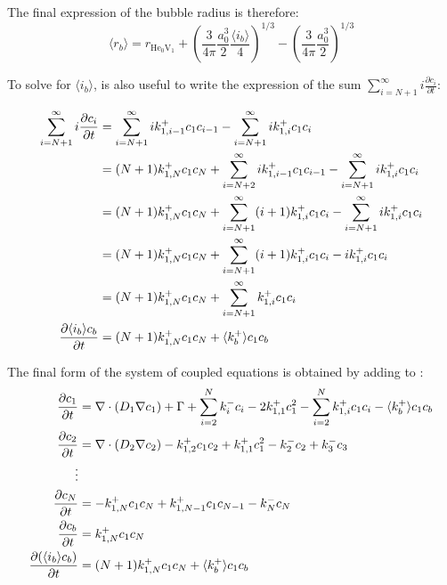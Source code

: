 The final expression of the bubble radius is therefore:
\begin{equation}
    \langle r_b \rangle = r_{\mathrm{He}_0 \mathrm{V}_1} + \left(\frac{3}{4 \pi} \frac{a_0^3}{2} \frac{\langle i_b \rangle}{4} \right)^{1/3} - \left(\frac{3}{4 \pi} \frac{a_0^3}{2} \right)^{1/3}
\end{equation}

To solve for $\langle i_b \rangle$, is also useful to write the expression of the sum $\sum\limits_{i=N+1}^\infty i \frac{\partial c_i}{\partial t}$:

\begin{align}
    \sum\limits_{i=N+1}^\infty i \frac{\partial c_i}{\partial t} &= \sum\limits_{i=N+1}^\infty i k_{1,i-1}^+ c_1 c_{i-1} - \sum\limits_{i=N+1}^\infty i k_{1,i}^+ c_1 c_{i} \nonumber\\
    &= (N+1) k_{1,N}^+ c_1 c_N + \sum\limits_{i=N+2}^\infty i k_{1,i-1}^+ c_1 c_{i-1} - \sum\limits_{i=N+1}^\infty i k_{1,i}^+ c_1 c_{i} \nonumber\\
    &= (N+1) k_{1,N}^+ c_1 c_N + \sum\limits_{i=N+1}^\infty (i + 1) k_{1,i}^+ c_1 c_{i} - \sum\limits_{i=N+1}^\infty i k_{1,i}^+ c_1 c_{i} \nonumber\\
    &= (N+1) k_{1,N}^+ c_1 c_N + \sum\limits_{i=N+1}^\infty (i + 1) k_{1,i}^+ c_1 c_{i} - i k_{1,i}^+ c_1 c_{i} \nonumber\\
    &= (N+1) k_{1,N}^+ c_1 c_N + \sum\limits_{i=N+1}^\infty k_{1,i}^+ c_1 c_{i} \nonumber\\
    \frac{\partial \langle i_b \rangle c_b}{\partial t} &= (N+1) k_{1,N}^+ c_1 c_N + \langle k_b^+ \rangle c_1 c_b
    \labeq{pde for d (cb ib)/ dt}
\end{align}

The final form of the system of coupled equations is obtained by adding  to :
\begin{subequations}
    \begin{align}
        \frac{\partial c_1}{\partial t} &= \nabla \cdot (D_1 \nabla c_1) + \Gamma + \sum\limits_{i=2}^N k_{i}^- c_i- 2k_{1, 1}^+ c_1^2 - \sum\limits_{i=2}^N k_{1,i}^+ c_1 c_i - \langle k_b^+ \rangle c_1 c_b \\
        \frac{\partial c_2}{\partial t} &= \nabla \cdot (D_2 \nabla c_2) - k_{1, 2}^+ c_1 c_2 + k_{1, 1}^+ c_1^2 - k_{2}^- c_2 + k_{3}^- c_3\\
        \vdots \nonumber\\
        \frac{\partial c_N}{\partial t} &= - k_{1, N}^+ c_1 c_N + k_{1, N-1}^+ c_1 c_{N-1} - k_{N}^- c_N\\
        \frac{\partial c_b}{\partial t} &= k_ {1,N}^+ c_1 c_N \\
        \frac{\partial (\langle i_b \rangle c_b)}{\partial t} &= (N+1)k_ {1,N}^+ c_1 c_N  + \langle k_b^+ \rangle c_1 c_b
    \end{align}
    \labeq{final system of equation}
\end{subequations}

